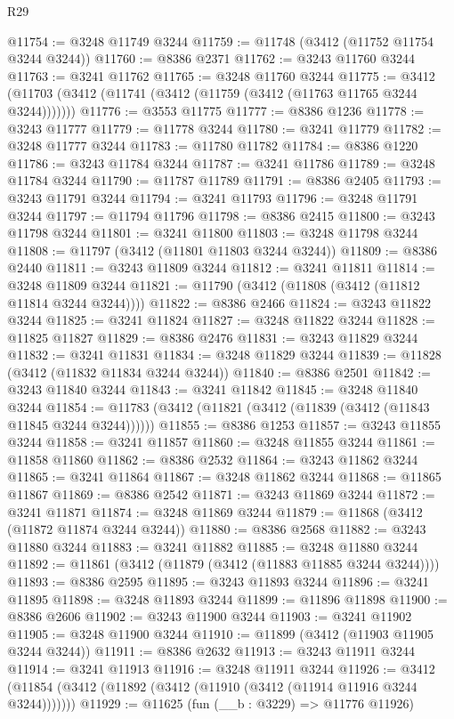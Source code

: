 \begin{lexlean}{R29}
\begin{coremodule}
@11754 := @3248 @11749 @3244
@11759 := @11748 (@3412 (@11752 @11754 @3244 @3244))
@11760 := @8386 @2371
@11762 := @3243 @11760 @3244
@11763 := @3241 @11762
@11765 := @3248 @11760 @3244
@11775 := @3412 (@11703 (@3412 (@11741 (@3412 (@11759 (@3412 (@11763 @11765 @3244 @3244)))))))
@11776 := @3553 @11775
@11777 := @8386 @1236
@11778 := @3243 @11777
@11779 := @11778 @3244
@11780 := @3241 @11779
@11782 := @3248 @11777 @3244
@11783 := @11780 @11782
@11784 := @8386 @1220
@11786 := @3243 @11784 @3244
@11787 := @3241 @11786
@11789 := @3248 @11784 @3244
@11790 := @11787 @11789
@11791 := @8386 @2405
@11793 := @3243 @11791 @3244
@11794 := @3241 @11793
@11796 := @3248 @11791 @3244
@11797 := @11794 @11796
@11798 := @8386 @2415
@11800 := @3243 @11798 @3244
@11801 := @3241 @11800
@11803 := @3248 @11798 @3244
@11808 := @11797 (@3412 (@11801 @11803 @3244 @3244))
@11809 := @8386 @2440
@11811 := @3243 @11809 @3244
@11812 := @3241 @11811
@11814 := @3248 @11809 @3244
@11821 := @11790 (@3412 (@11808 (@3412 (@11812 @11814 @3244 @3244))))
@11822 := @8386 @2466
@11824 := @3243 @11822 @3244
@11825 := @3241 @11824
@11827 := @3248 @11822 @3244
@11828 := @11825 @11827
@11829 := @8386 @2476
@11831 := @3243 @11829 @3244
@11832 := @3241 @11831
@11834 := @3248 @11829 @3244
@11839 := @11828 (@3412 (@11832 @11834 @3244 @3244))
@11840 := @8386 @2501
@11842 := @3243 @11840 @3244
@11843 := @3241 @11842
@11845 := @3248 @11840 @3244
@11854 := @11783 (@3412 (@11821 (@3412 (@11839 (@3412 (@11843 @11845 @3244 @3244))))))
@11855 := @8386 @1253
@11857 := @3243 @11855 @3244
@11858 := @3241 @11857
@11860 := @3248 @11855 @3244
@11861 := @11858 @11860
@11862 := @8386 @2532
@11864 := @3243 @11862 @3244
@11865 := @3241 @11864
@11867 := @3248 @11862 @3244
@11868 := @11865 @11867
@11869 := @8386 @2542
@11871 := @3243 @11869 @3244
@11872 := @3241 @11871
@11874 := @3248 @11869 @3244
@11879 := @11868 (@3412 (@11872 @11874 @3244 @3244))
@11880 := @8386 @2568
@11882 := @3243 @11880 @3244
@11883 := @3241 @11882
@11885 := @3248 @11880 @3244
@11892 := @11861 (@3412 (@11879 (@3412 (@11883 @11885 @3244 @3244))))
@11893 := @8386 @2595
@11895 := @3243 @11893 @3244
@11896 := @3241 @11895
@11898 := @3248 @11893 @3244
@11899 := @11896 @11898
@11900 := @8386 @2606
@11902 := @3243 @11900 @3244
@11903 := @3241 @11902
@11905 := @3248 @11900 @3244
@11910 := @11899 (@3412 (@11903 @11905 @3244 @3244))
@11911 := @8386 @2632
@11913 := @3243 @11911 @3244
@11914 := @3241 @11913
@11916 := @3248 @11911 @3244
@11926 := @3412 (@11854 (@3412 (@11892 (@3412 (@11910 (@3412 (@11914 @11916 @3244 @3244)))))))
@11929 := @11625 (fun (__b : @3229) => @11776 @11926)

\end{coremodule}
\end{lexlean}
